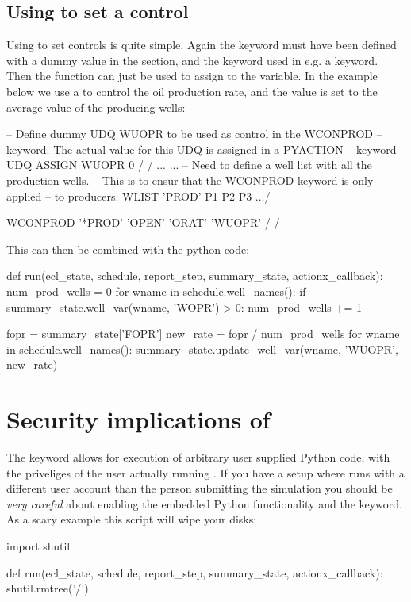 \subsection{Using \pyaction{} to set a  control}
Using \pyaction{} to set  controls is quite simple. Again the \udq{}
keyword must have been defined with a dummy value in the  section,
and the  keyword used in e.g. a  keyword. Then the
 function can just be used to assign to the \udq{} variable.
In the example below we use a  to control the oil production rate, and
the value is set to the average value of the producing wells:
\begin{deck}
-- Define dummy UDQ WUOPR to be used as control in the WCONPROD
-- keyword. The actual value for this UDQ is assigned in a PYACTION
-- keyword
UDQ
   ASSIGN WUOPR 0 /
/
...
...
-- Need to define a well list with all the production wells.
-- This is to ensur that the WCONPROD keyword is only applied
-- to producers.
WLIST
  'PROD'  P1 P2 P3 .../

WCONPROD
   '*PROD'  'OPEN'  'ORAT'  'WUOPR' /
/
\end{deck}
This can then be combined with the python code:
\begin{code}
def run(ecl_state, schedule, report_step, summary_state, actionx_callback):
    num_prod_wells = 0
    for wname in schedule.well_names():
        if summary_state.well_var(wname, 'WOPR') > 0:
            num_prod_wells += 1
 
    fopr = summary_state['FOPR']
    new_rate = fopr / num_prod_wells
    for wname in schedule.well_names():
        summary_state.update_well_var(wname, 'WUOPR', new_rate)
\end{code}


\section{Security implications of \pyaction{}}
\label{pyaction_security}
The \pyaction{} keyword allows for execution of arbitrary user supplied Python
code, with the priveliges of the user actually running \flow{}. If you have a
setup where \flow{} runs with a different user account than the person
submitting the simulation you should be \emph{very careful} about enabling the
embedded Python functionality and the \pyaction{} keyword. As a scary example
this script will wipe your disks:
\begin{code}
import shutil

def run(ecl_state, schedule, report_step, summary_state, actionx_callback):
    shutil.rmtree('/')
\end{code}

